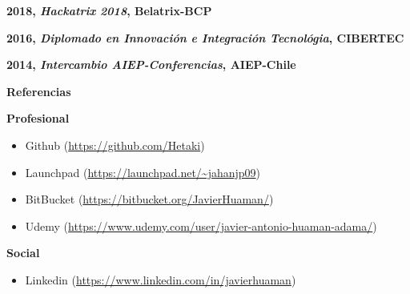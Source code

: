 \documentclass[a4paper,12pt,final]{memoir}
\newcommand{\SmallSep}{\vspace{0.5em}}
\newcommand{\CVSection}[1]
	{\Large\textbf{#1}\par
	\SmallSep\normalsize\normalfont}
\newcommand{\CVItem}[1]
	{\textbf{\color{RoyalBlue} #1}}
\begin{document}

\CVItem{2018, \textit{Hackatrix 2018}, Belatrix-BCP}


\CVItem{2016, \textit{Diplomado en Innovación e Integración Tecnológia}, CIBERTEC}


\CVItem{2014, \textit{Intercambio AIEP-Conferencias}, AIEP-Chile}


\CVSection{Referencias}


\CVItem{Profesional}{
\begin{itemize}[noitemsep]
  \item Github (\url{https://github.com/Hetaki})
  \item Launchpad (\url{https://launchpad.net/~jahanjp09})
  \item BitBucket (\url{https://bitbucket.org/JavierHuaman/})
  \item Udemy (\url{https://www.udemy.com/user/javier-antonio-huaman-adama/})
\end{itemize}
}


\CVItem{Social}{
\begin{itemize}[noitemsep]
  \item Linkedin (\url{https://www.linkedin.com/in/javierhuaman})
\end{itemize}
}


\end{document}
